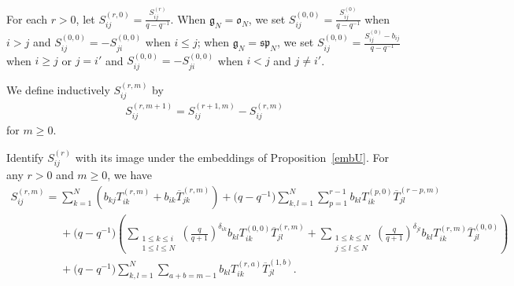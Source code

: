 \documentclass[pdftex]{sigma}
\numberwithin{theorem}{section}
\numberwithin{proposition}{section}
\numberwithin{lemma}{section}
\numberwithin{corollary}{section}
\numberwithin{definition}{section}
\numberwithin{example}{section}
\numberwithin{remark}{section}
\numberwithin{note}{section}
\numberwithin{equation}{section}
\begin{document}
For each $r>0$, let $S_{ij}^{(r,0)}=\frac{S_{ij}^{(r)}}{q-q^{-1}}$.
When $\mathfrak{g}_N = \mathfrak{o}_N$, we set $S_{ij}^{(0,0)}=\frac{S_{ij}^{(0)}}{q-q^{-1}}$ when $i>j$ and
$S_{ij}^{(0,0)}=-S_{ji}^{(0,0)}$ when $i\le j$; when $\mathfrak{g}_N = \mathfrak{sp}_N$, we set
$S_{ij}^{(0,0)}=\frac{S_{ij}^{(0)}-b_{ij}}{q-q^{-1}}$ when $i\ge j$ or $j=i'$ and $S_{ij}^{(0,0)} = -S_{ji}^{(0,0)}$
when $i<j$ and $j\neq i'$.

We def\/ine inductively $S_{ij}^{(r,m)}$ by
\begin{gather*}
S_{ij}^{(r,m+1)}=S_{ij}^{(r+1,m)}-S_{ij}^{(r,m)}
\end{gather*}
for $m \geq 0$.
\begin{lemma}
Identify $S_{ij}^{(r)}$ with its image under the embeddings of Proposition~{\rm \ref{embU}}.
For any $r>0$ and $m \geq 0$, we have
\begin{gather*}
S_{ij}^{(r,m)}=\sum\limits_{k=1}^N \left(b_{kj} T_{ik}^{(r,m)} + b_{ik} \overline{T}_{jk}^{(r,m)} \right) +
\big(q-q^{-1}\big) \sum\limits_{k,l=1}^N \sum\limits_{p=1}^{r-1} b_{kl} T_{ik}^{(p,0)} \overline{T}_{jl}^{(r-p,m)}
\\
\phantom{S_{ij}^{(r,m)}=}{}
 + \big(q-q^{-1}\big)\!\left(\sum\limits_{\substack{1 \leq k \leq i\\ 1 \leq l \leq N}}\!\left(\frac{q}{q+1}\right)^{\delta_{ik}}\!
b_{kl} T_{ik}^{(0,0)} \overline{T}_{jl}^{(r,m)} + \sum\limits_{\substack{1 \leq k \leq N \\ j \leq l \leq N}}\!
\left(\frac{q}{q+1}\right)^{\delta_{jl}} \! b_{kl} T_{ik}^{(r,m)} \overline{T}_{jl}^{(0,0)} \!\right)
\\
\phantom{S_{ij}^{(r,m)}=}{}
  + \big(q-q^{-1}\big) \sum\limits_{k,l=1}^N \sum\limits_{a+b=m-1} b_{kl} T_{ik}^{(r,a)} \overline{T}_{jl}^{(1,b)}.
\end{gather*}
\end{lemma}
\end{document}
